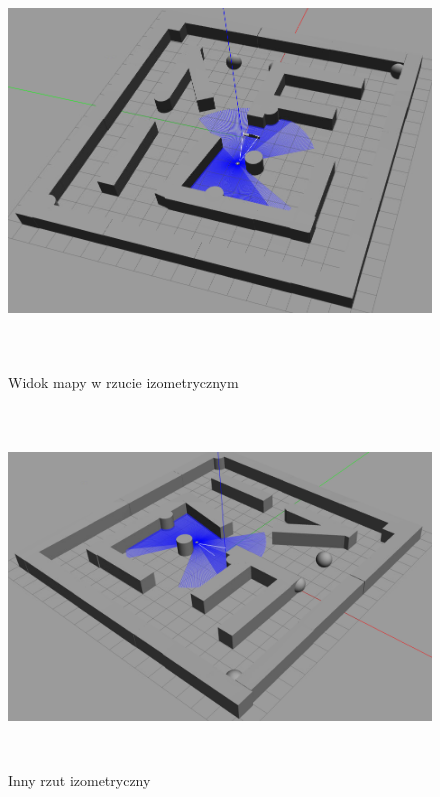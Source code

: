 \documentclass[12pt]{article}
\begin{document}
\begin{figure}[!htb]
    \centering
    \includegraphics[height=11cm]{./images/mapa1.png}
    \caption{Widok mapy w rzucie izometrycznym}
\end{figure}


\begin{figure}[!htb]
    \centering
    \includegraphics[height=9.5cm]{./images/mapa2.png}
    \caption{Inny rzut izometryczny}
\end{figure}
\end{document}
